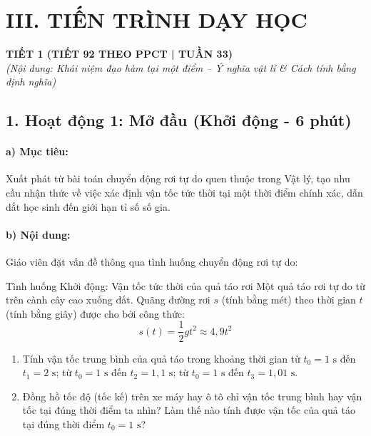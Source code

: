 \documentclass[12pt, a4paper]{article}
\begin{document}
\section*{III. TIẾN TRÌNH DẠY HỌC}

\begin{center}
    \textbf{\large TIẾT 1 (TIẾT 92 THEO PPCT | TUẦN 33)}\\[4pt]
    \textit{(Nội dung: Khái niệm đạo hàm tại một điểm -- Ý nghĩa vật lí \& Cách tính bằng định nghĩa)}
\end{center}

\subsection*{1. Hoạt động 1: Mở đầu (Khởi động - 6 phút)}

\paragraph{a) Mục tiêu:} Xuất phát từ bài toán chuyển động rơi tự do quen thuộc trong Vật lý, tạo nhu cầu nhận thức về việc xác định vận tốc tức thời tại một thời điểm chính xác, dẫn dắt học sinh đến giới hạn tỉ số số gia.

\paragraph{b) Nội dung:} Giáo viên đặt vấn đề thông qua tình huống chuyển động rơi tự do:
\begin{pedabox}{Tình huống Khởi động: Vận tốc tức thời của quả táo rơi}
Một quả táo rơi tự do từ trên cành cây cao xuống đất. Quãng đường rơi $s$ (tính bằng mét) theo thời gian $t$ (tính bằng giây) được cho bởi công thức:
$$s(t) = \dfrac{1}{2} g t^2 \approx 4{,}9 t^2$$
\begin{enumerate}[leftmargin=0.6cm]
    \item Tính vận tốc trung bình của quả táo trong khoảng thời gian từ $t_0 = 1\text{ s}$ đến $t_1 = 2\text{ s}$; từ $t_0 = 1\text{ s}$ đến $t_2 = 1{,}1\text{ s}$; từ $t_0 = 1\text{ s}$ đến $t_3 = 1{,}01\text{ s}$.
    \item Đồng hồ tốc độ (tốc kế) trên xe máy hay ô tô chỉ vận tốc trung bình hay vận tốc tại đúng thời điểm ta nhìn? Làm thế nào tính được vận tốc của quả táo tại đúng thời điểm $t_0 = 1\text{ s}$?
\end{enumerate}
\end{pedabox}
\end{document}
